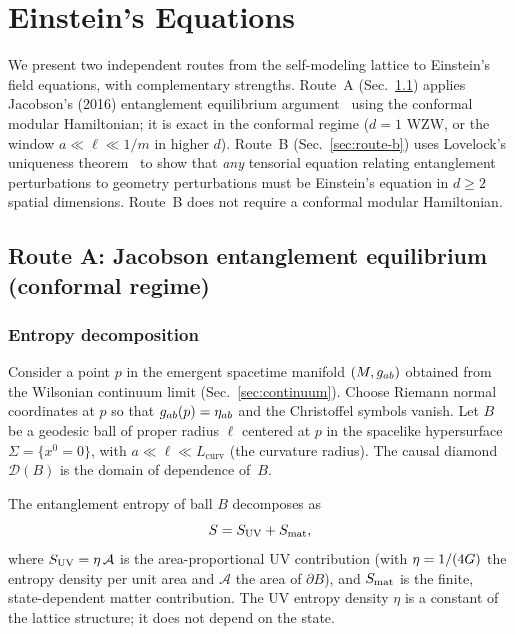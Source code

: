 \section{Einstein's Equations}
\label{sec:einstein}

We present two independent routes from the self-modeling lattice to
Einstein's field equations, with complementary strengths.  Route~A
(Sec.~\ref{sec:route-a}) applies Jacobson's (2016) entanglement
equilibrium argument~\cite{Jacobson2016} using the conformal modular
Hamiltonian; it is exact in the conformal regime ($d = 1$ WZW, or the
window $a \ll \ell \ll 1/m$ in higher $d$).  Route~B
(Sec.~\ref{sec:route-b}) uses Lovelock's uniqueness
theorem~\cite{Lovelock1971, Lovelock1972} to show that \emph{any}
tensorial equation relating entanglement perturbations to geometry
perturbations must be Einstein's equation in $d \geq 2$ spatial
dimensions.  Route~B does not require a conformal modular Hamiltonian.

\subsection{Route A: Jacobson entanglement equilibrium (conformal regime)}
\label{sec:route-a}

\subsubsection{Entropy decomposition}
\label{sec:setup}

Consider a point $p$ in the emergent spacetime manifold $(M, g_{ab})$
obtained from the Wilsonian continuum limit
(Sec.~\ref{sec:continuum}).  Choose Riemann normal coordinates at $p$
so that $g_{ab}(p) = \eta_{ab}$ and the Christoffel symbols vanish.  Let
$B$ be a geodesic ball of proper radius $\ell$ centered at $p$ in the
spacelike hypersurface $\Sigma = \{x^0 = 0\}$, with $a \ll \ell \ll
L_{\mathrm{curv}}$ (the curvature radius).  The causal diamond
$\mathcal{D}(B)$ is the domain of dependence of~$B$.

The entanglement entropy of ball $B$ decomposes as~\cite{Jacobson2016}
\begin{equation}
  S = S_{\mathrm{UV}} + S_{\mathrm{mat}},
  \label{eq:s-decomp}
\end{equation}
where $S_{\mathrm{UV}} = \eta\, \mathcal{A}$ is the
area-proportional UV contribution (with $\eta = 1/(4G)$ the
entropy density per unit area and $\mathcal{A}$ the area of
$\partial B$), and $S_{\mathrm{mat}}$ is the finite,
state-dependent matter contribution.  The UV entropy density $\eta$
is a constant of the lattice structure; it does not depend on the
state.

